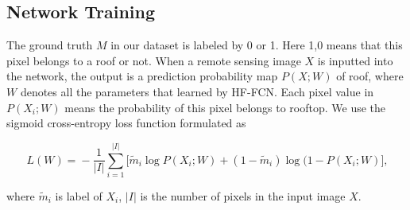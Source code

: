 \subsection{Network Training}
\setlength{\parindent}{2ex}The ground truth $M$ in our dataset is labeled by 0 or 1. Here 1,0 means that this pixel belongs to a roof or not. When a remote sensing image ${X}$ is inputted into the network, the output is a prediction probability map $P(X;W)$ of roof, where $W$ denotes all the parameters that learned by HF-FCN. Each pixel value in $P(X_{i};W)$ means the probability of this pixel belongs to rooftop. We use the sigmoid cross-entropy loss function formulated as
\begin{small}
\begin{equation}
     \label{loss}
     \ L(W)\! =\! -\frac{1}{\vert I\vert}\sum_{i=1}^{\vert I \vert}\lbrack{\tilde{m}_i \log{P(X_{i};W)}\!+\!(1\!-\!\tilde{m}_i)\log(1\!-\!P(X_{i};W)}\rbrack,
\end{equation}
\end{small}
where $\tilde{m}_i$ is label of $X_{i}$, ${\vert I\vert}$ is the number of pixels in the input image ${X}$.
